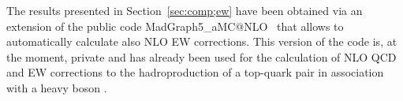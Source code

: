 \documentclass[11pt]{cernrep}
\renewcommand{\arraystretch}{1.6}
\begin{document}


The results presented in Section~\ref{sec:comp;ew} have been obtained
via an extension of the public code {\sc\small
  MadGraph5\_\-aMC@NLO}~\cite{Alwall:2014hca} that allows to
automatically calculate also NLO EW corrections. This version of the
code is, at the moment, private and has already been used for the
calculation of NLO QCD and EW corrections to the hadroproduction of a
top-quark pair in association with a heavy boson
\cite{Frixione:2014qaa, Frixione:2015zaa}.
\end{document}
